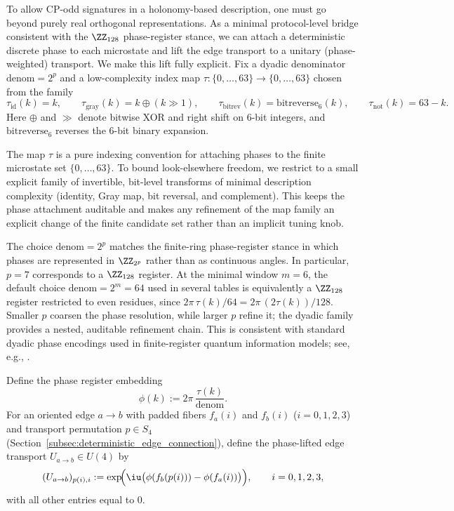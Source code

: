 To allow CP-odd signatures in a holonomy-based description, one must go beyond purely real orthogonal representations.
As a minimal protocol-level bridge consistent with the $\ZZ_{128}$ phase-register stance, we can attach a deterministic discrete phase to each microstate and lift the edge transport to a unitary (phase-weighted) transport.
We make this lift fully explicit.
Fix a dyadic denominator $\mathrm{denom}=2^p$ and a low-complexity index map $\tau:\{0,\dots,63\}\to\{0,\dots,63\}$ chosen from the family
\[
\tau_{\mathrm{id}}(k)=k,\qquad
\tau_{\mathrm{gray}}(k)=k\oplus (k\!\gg\!1),\qquad
\tau_{\mathrm{bitrev}}(k)=\mathrm{bitreverse}_6(k),\qquad
\tau_{\mathrm{not}}(k)=63-k.
\]
Here $\oplus$ and $\gg$ denote bitwise XOR and right shift on $6$-bit integers, and $\mathrm{bitreverse}_6$ reverses the $6$-bit binary expansion.
\begin{remark}\label{rem:tau_family_bounded}
The map $\tau$ is a pure indexing convention for attaching phases to the finite microstate set $\{0,\dots,63\}$.
To bound look-elsewhere freedom, we restrict to a small explicit family of invertible, bit-level transforms of minimal description complexity (identity, Gray map, bit reversal, and complement).
This keeps the phase attachment auditable and makes any refinement of the map family an explicit change of the finite candidate set rather than an implicit tuning knob.
\end{remark}
\begin{remark}\label{rem:dyadic_phase_register}
The choice $\mathrm{denom}=2^p$ matches the finite-ring phase-register stance in which phases are represented in $\ZZ_{2^p}$ rather than as continuous angles.
In particular, $p=7$ corresponds to a $\ZZ_{128}$ register.
At the minimal window $m=6$, the default choice $\mathrm{denom}=2^m=64$ used in several tables is equivalently a $\ZZ_{128}$ register restricted to even residues, since $2\pi\,\tau(k)/64=2\pi\,(2\tau(k))/128$.
Smaller $p$ coarsen the phase resolution, while larger $p$ refine it; the dyadic family provides a nested, auditable refinement chain.
This is consistent with standard dyadic phase encodings used in finite-register quantum information models; see, e.g., \cite{NielsenChuang2010}.
\end{remark}
Define the phase register embedding
\begin{equation}\label{eq:holonomy_phase_def}
\phi(k):=2\pi\,\frac{\tau(k)}{\mathrm{denom}}.
\end{equation}
For an oriented edge $a\to b$ with padded fibers $f_a(i)$ and $f_b(i)$ ($i=0,1,2,3$) and transport permutation $p\in S_4$ (Section~\ref{subsec:deterministic_edge_connection}), define the phase-lifted edge transport $U_{a\to b}\in U(4)$ by
\begin{equation}\label{eq:phase_lift_edge_transport}
(U_{a\to b})_{p(i),i}:=\exp\!\Bigl(\iu\bigl(\phi(f_b(p(i)))-\phi(f_a(i))\bigr)\Bigr),
\qquad i=0,1,2,3,
\end{equation}
with all other entries equal to $0$.

